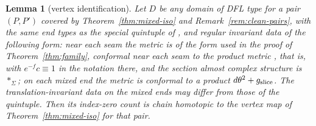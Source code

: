 \documentclass[11pt]{amsart}
\newtheorem{lemma}[theorem]{Lemma}
\theoremstyle{definition}
\theoremstyle{remark}
\theoremstyle{plain}
\numberwithin{equation}{section}
\begin{document}
\begin{lemma}[vertex identification]\label{lem:vertex-identification}
Let $D$ be any domain of DFL type for a pair $(P,P')$ covered by
Theorem~\ref{thm:mixed-iso} and Remark~\ref{rem:clean-pairs}, with the same
end types as the special quintuple of \cite[Section~3.1]{DFL}, and regular
invariant data of the following form: near each seam the metric is of the form
used in the proof of Theorem~\ref{thm:family}, conformal near each seam to the product metric
\cite[(1.1)]{DFL-mixed}, that is, with $e^{-f}c\equiv1$ in the notation there, and the
section almost complex structure is $*_\Sigma$; on each mixed end the metric is
conformal to a product $d\theta^2+g_{\rm slice}$. The translation-invariant data on the mixed ends may differ
from those of the quintuple. Then its index-zero count is chain homotopic to the vertex
map of Theorem~\ref{thm:mixed-iso} for that pair.
\end{lemma}
\end{document}
